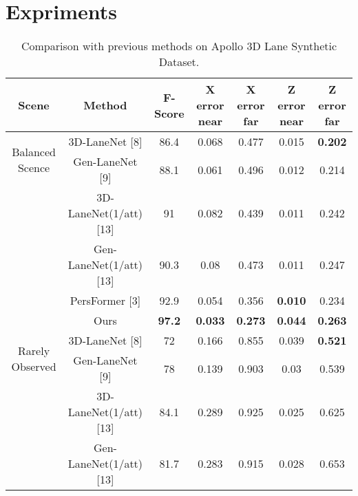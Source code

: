 \section{Expriments}

\begin{table*}[ht]
    \caption{Comparison with previous methods on Apollo 3D Lane Synthetic Dataset.}\label{tab:Comparision table}
    \center
    \begin{tabular}{ccccccc}%
        \toprule %
        Scene & Method & F-Score & X error near & X error far & Z error near & Z error far \\
        \toprule %
        \multirow{2}{*}{Balanced Scence} & 3D-LaneNet [8] & 86.4 & 0.068 & 0.477 & 0.015 & \textbf{0.202} \\ %
        \multirow{2}{*}{ }               & Gen-LaneNet [9] & 88.1 & 0.061 & 0.496 & 0.012 & 0.214  \\
        \multirow{2}{*}{ }               & 3D-LaneNet(1/att) [13] & 91 & 0.082 & 0.439 & 0.011 & 0.242  \\
        \multirow{2}{*}{ }               & Gen-LaneNet(1/att) [13] & 90.3 & 0.08 & 0.473 & 0.011 & 0.247  \\
        \multirow{2}{*}{ }               & PersFormer [3] & 92.9 & 0.054 & 0.356 & \textbf{0.010}  & 0.234 \\
        \multirow{2}{*}{ }               & Ours       & \textbf{97.2} & \textbf{0.033} & \textbf{0.273} & \textbf{0.044} & \textbf{0.263} \\
        \midrule %
        \multirow{2}{*}{Rarely Observed} & 3D-LaneNet [8] & 72 & 0.166 & 0.855 & 0.039 & \textbf{0.521} \\
        \multirow{2}{*}{ }               & Gen-LaneNet [9] & 78 & 0.139 & 0.903 & 0.03 & 0.539  \\
        \multirow{2}{*}{ }               & 3D-LaneNet(1/att) [13] & 84.1 & 0.289 & 0.925 & 0.025 & 0.625  \\
        \multirow{2}{*}{ }               & Gen-LaneNet(1/att) [13] & 81.7 & 0.283 & 0.915 & 0.028 & 0.653  \\

\end{tabular}
\end{table*}

